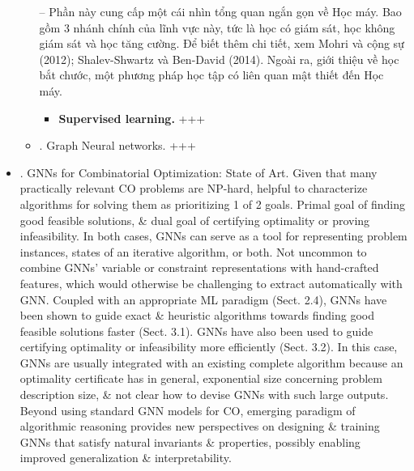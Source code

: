 \documentclass{article}
\begin{document}
\begin{itemize}
\begin{itemize}
        -- Phần này cung cấp một cái nhìn tổng quan ngắn gọn về Học máy. Bao gồm 3 nhánh chính của lĩnh vực này, tức là học có giám sát, học không giám sát và học tăng cường. Để biết thêm chi tiết, xem Mohri và cộng sự (2012); Shalev-Shwartz và Ben-David (2014). Ngoài ra, giới thiệu về học bắt chước, một phương pháp học tập có liên quan mật thiết đến Học máy.
        \begin{itemize}
            \item {\bf Supervised learning.} +++
        \end{itemize}
        \item {. Graph Neural networks.} +++
    \end{itemize}
    \item {. GNNs for Combinatorial Optimization: State of Art.} Given that many practically relevant CO problems are NP-hard, helpful to characterize algorithms for solving them as prioritizing 1 of 2 goals. Primal goal of finding good feasible solutions, \& dual goal of certifying optimality or proving infeasibility. In both cases, GNNs can serve as a tool for representing problem instances, states of an iterative algorithm, or both. Not uncommon to combine GNNs' variable or constraint representations with hand-crafted features, which would otherwise be challenging to extract automatically with GNN. Coupled with an appropriate ML paradigm (Sect. 2.4), GNNs have been shown to guide exact \& heuristic algorithms towards finding good feasible solutions faster (Sect. 3.1). GNNs have also been used to guide certifying optimality or infeasibility more efficiently (Sect. 3.2). In this case, GNNs are usually integrated with an existing complete algorithm because an optimality certificate has in general, exponential size concerning problem description size, \& not clear how to devise GNNs with such large outputs. Beyond using standard GNN models for CO, emerging paradigm of algorithmic reasoning provides new perspectives on designing \& training GNNs that satisfy natural invariants \& properties, possibly enabling improved generalization \& interpretability.


\end{itemize}
\end{document}
